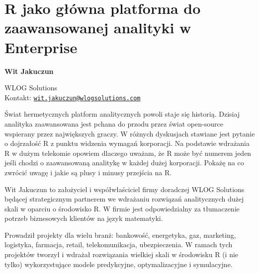 \documentclass[\main/boa.tex]{subfiles}
\begin{document}
\section{R jako główna platforma do zaawansowanej analityki w Enterprise}


\begin{minipage}{0.915\textwidth}
	\centering
  {\bf \LARGE {} Wit Jakuczun}
\end{minipage}



\begin{affiliations}
\begin{minipage}{0.915\textwidth}
\centering
\large WLOG Solutions \\[1pt]
Kontakt: \href{mailto:wit.jakuczun@wlogsolutions.com}{\nolinkurl{wit.jakuczun@wlogsolutions.com}}\\
\end{minipage}
\end{affiliations}


Świat hermetycznych platform analitycznych powoli staje się historią. Dzisiaj analityka zaawansowana jest pchana do przodu przez świat open-source wspierany przez największych graczy. W różnych dyskusjach stawiane jest pytanie o dojrzałość R z punktu widzenia wymagań korporacji. Na podstawie wdrażania R w dużym telekomie opowiem dlaczego uważam, że R może być numerem jeden jeśli chodzi o zaawansowaną analitykę w każdej dużej korporacji. Pokażę na co zwrócić uwagę i jakie są plusy i minusy przejścia na R. 

\bio
Wit Jakuczun to założyciel i współwłaściciel firmy doradczej WLOG Solutions będącej strategicznym partnerem we wdrażaniu rozwiązań analitycznych dużej skali w oparciu o środowisko R. W firmie jest odpowiedzialny za tłumaczenie potrzeb biznesowych klientów na język matematyki.

Prowadził projekty dla wielu branż: bankowość, energetyka, gaz, marketing, logistyka, farmacja, retail, telekomunikacja, ubezpieczenia. W ramach tych projektów tworzył i wdrażał rozwiązania wielkiej skali w środowisku R (i nie tylko) wykorzystujące modele predykcyjne, optymalizacyjne i symulacyjne.
\end{document}
